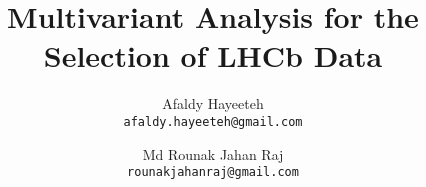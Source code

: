\title{Multivariant Analysis for the Selection of LHCb Data}


\author{Afaldy Hayeeteh\\ \texttt{afaldy.hayeeteh@gmail.com} \and Md Rounak Jahan Raj \\ \texttt{rounakjahanraj@gmail.com}}




\maketitle



